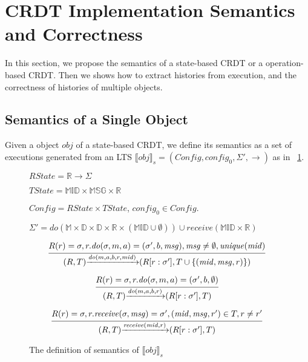 
\section{CRDT Implementation Semantics and Correctness}
\label{sec:CRDT implementation semantics and correctness}

In this section, we propose the semantics of a state-based CRDT or a operation-based CRDT. Then we shows how to extract histories from execution, and the correctness of histories of multiple objects. 



\subsection{Semantics of a Single Object}
\label{subsec:semantics of a single object}

Given a object $\mathit{obj}$ of a state-based CRDT, we define its semantics as a set of executions generated from an LTS $\llbracket \mathit{obj} \rrbracket_s = (\mathit{Config},\mathit{config}_0,\Sigma',\rightarrow)$ as in \figurename~\ref{fig:the semantics of a state-based CRDT object}.

\begin{figure}[ht]
$\mathit{RState} = \mathbb{R} \rightarrow \Sigma$

$\mathit{TState} = \mathbb{MID} \times \mathbb{MSG} \times \mathbb{R}$

$\mathit{Config} = \mathit{RState} \times \mathit{TState}$, $\mathit{config}_0 \in \mathit{Config}$. 

$\Sigma' = \mathit{do}(\mathbb{M} \times \mathbb{D} \times \mathbb{D} \times \mathbb{R} \times (\mathbb{MID} \cup \emptyset)) \cup \mathit{receive}(\mathbb{MID} \times \mathbb{R})$ 

\[
\begin{array}{l c}
\bigfrac{ R(r) = \sigma, r.\mathit{do}(\sigma,m,a) = (\sigma',b,\mathit{msg}), \mathit{msg} \neq \emptyset, \mathit{unique}(\mathit{mid}) }
{ (R,T) {\xrightarrow{\mathit{do}(m,a,b,r,\mathit{mid})}} (R[r:\sigma'],T \cup \{ (\mathit{mid},\mathit{msg},r) \}) }
\end{array}
\]

\[
\begin{array}{l c}
\bigfrac{ R(r) = \sigma, r.\mathit{do}(\sigma,m,a) = (\sigma',b,\emptyset) }
{ (R,T) {\xrightarrow{\mathit{do}(m,a,b,r)}} (R[r:\sigma'],T ) }
\end{array}
\]

\[
\begin{array}{l c}
\bigfrac{ R(r) = \sigma, r.\mathit{receive}(\sigma,\mathit{msg}) = \sigma',(\mathit{mid},\mathit{msg},r') \in T, r \neq r'}
{ (R,T) {\xrightarrow{\mathit{receive}(\mathit{mid},r)}} (R[r:\sigma'],T) }
\end{array}
\]
\caption{The definition of semantics of $\llbracket \mathit{obj} \rrbracket_s$}
\label{fig:the semantics of a state-based CRDT object}
\end{figure}

